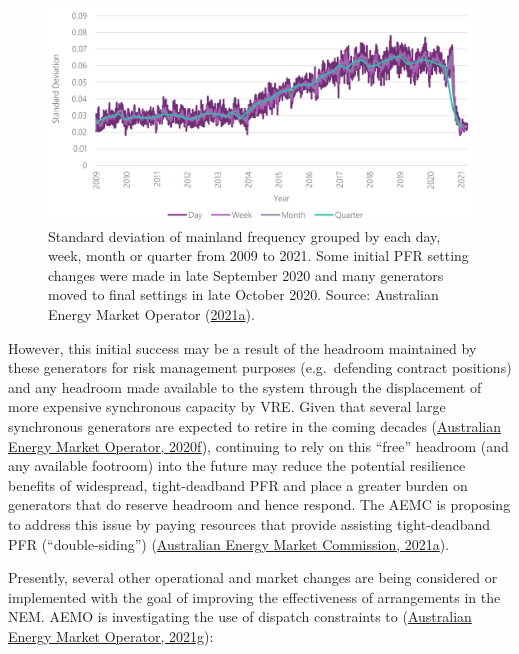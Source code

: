 \documentclass[12pt,a4paper,]{report}
\begin{document}
\begin{figure}
\hypertarget{fig:mpfr_dist}{%
\centering
\includegraphics{source/figures/f_stddev_2009_2021.png}
\caption[Standard deviation of NEM mainland frequency from 2009 to
2021]{Standard deviation of mainland frequency grouped by each day,
week, month or quarter from 2009 to 2021. Some initial PFR setting
changes were made in late September 2020 and many generators moved to
final settings in late October 2020. Source: Australian Energy Market
Operator
(\protect\hyperlink{ref-australianenergymarketoperatorEnduringPrimaryFrequency2021}{2021a}).}\label{fig:mpfr_dist}
}
\end{figure}

However, this initial success may be a result of the headroom maintained
by these generators for risk management purposes (e.g.~defending
contract positions) and any headroom made available to the system
through the displacement of more expensive synchronous capacity by VRE.
Given that several large synchronous generators are expected to retire
in the coming decades
(\protect\hyperlink{ref-australianenergymarketoperator2020IntegratedSystem2020}{Australian
Energy Market Operator, 2020f}), continuing to rely on this ``free''
headroom (and any available footroom) into the future may reduce the
potential resilience benefits of widespread, tight-deadband PFR and
place a greater burden on generators that do reserve headroom and hence
respond. The AEMC is proposing to address this issue by paying resources
that provide assisting tight-deadband PFR (``double-siding'')
(\protect\hyperlink{ref-australianenergymarketcommissionPrimaryFrequencyResponse2021}{Australian
Energy Market Commission, 2021a}).

Presently, several other operational and market changes are being
considered or implemented with the goal of improving the effectiveness
of arrangements in the NEM. AEMO is investigating the use of dispatch
constraints to
(\protect\hyperlink{ref-australianenergymarketoperatorFrequencyControlWork2021}{Australian
Energy Market Operator, 2021g}):
\end{document}

